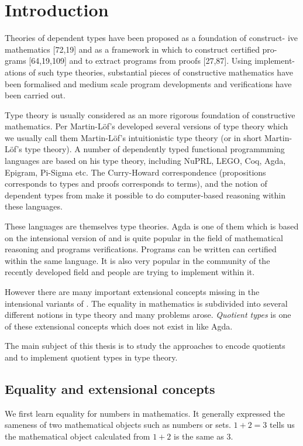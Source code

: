 \chapter{Introduction}

Theories of dependent types have been proposed as a foundation of construct- ive mathematics [72,19] and as a framework in which to construct certified pro- grams [64,19,109] and to extract programs from proofs [27,87]. Using implement- ations of such type theories, substantial pieces of constructive mathematics have been formalised and medium scale program developments and verifications have been carried out.


Type theory is usually considered as an more rigorous foundation of
constructive mathematics. Per Martin-L\"{o}f's developed several
versions of type theory which we usually call them Martin-Löf's
intuitionistic type theory (or in short Martin-Löf's type theory). A number of
dependently typed functional programmming languages are based on his
type theory, including NuPRL, LEGO, Coq, Agda, Epigram, Pi-Sigma etc.
The Curry-Howard correspondence (propositions corresponds to types and
proofs corresponds to terms), and the notion of dependent types from
\mltt make it possible to do computer-based reasoning within these
languages.

These languages are themselves type theories. Agda is one of them
which is based on the intensional version of \mltt and is quite
popular in the field of mathematical reasoning and programs
verifications. Programs can be written can certified within the same
language. It is also very popular in the community of the recently
developed field \hott and people are trying to implement \hott within
it.

However there are many important extensional concepts missing in the
intensional variants of \mltt. The equality in mathematics is
subdivided into several different notions in type theory and many
problems arose.
\emph{Quotient types} is one of these extensional
concepts which does not exist in \itt like Agda. 

The main subject of this thesis is to study the approaches to encode
quotients and to implement quotient types in type theory.

\section{Equality and extensional concepts}

We first learn equality for numbers in mathematics. It generally
expressed the sameness of two mathematical objects such as numbers or sets.
$1+2=3$ tells us the mathematical object calculated from $1+2$ is the
same as $3$.

